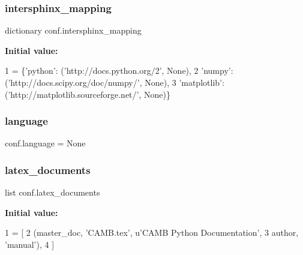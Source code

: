\subsubsection{\texorpdfstring{intersphinx\+\_\+mapping}{intersphinx\_mapping}}
{\footnotesize\ttfamily dictionary conf.\+intersphinx\+\_\+mapping}

{\bfseries Initial value\+:}
\begin{DoxyCode}
1 =  \{\textcolor{stringliteral}{'python'}: (\textcolor{stringliteral}{'http://docs.python.org/2'}, \textcolor{keywordtype}{None}),
2                        \textcolor{stringliteral}{'numpy'}: (\textcolor{stringliteral}{'http://docs.scipy.org/doc/numpy/'}, \textcolor{keywordtype}{None}),
3                        \textcolor{stringliteral}{'matplotlib'}: (\textcolor{stringliteral}{'http://matplotlib.sourceforge.net/'}, \textcolor{keywordtype}{None})\}
\end{DoxyCode}
\mbox{\label{namespaceconf_ad76a2e6d7bfa880ebb4042c08e8b4e12}} 
\subsubsection{\texorpdfstring{language}{language}}
{\footnotesize\ttfamily conf.\+language = None}

\mbox{\label{namespaceconf_a00b7896473527f894006130b1113cb4b}} 
\subsubsection{\texorpdfstring{latex\+\_\+documents}{latex\_documents}}
{\footnotesize\ttfamily list conf.\+latex\+\_\+documents}

{\bfseries Initial value\+:}
\begin{DoxyCode}
1 =  [
2   (master\_doc, \textcolor{stringliteral}{'CAMB.tex'}, \textcolor{stringliteral}{u'CAMB Python Documentation'},
3    author, \textcolor{stringliteral}{'manual'}),
4 ]
\end{DoxyCode}
\mbox{\label{namespaceconf_a82b98d5b4f4b8dee5476fb983fd85407}} 
